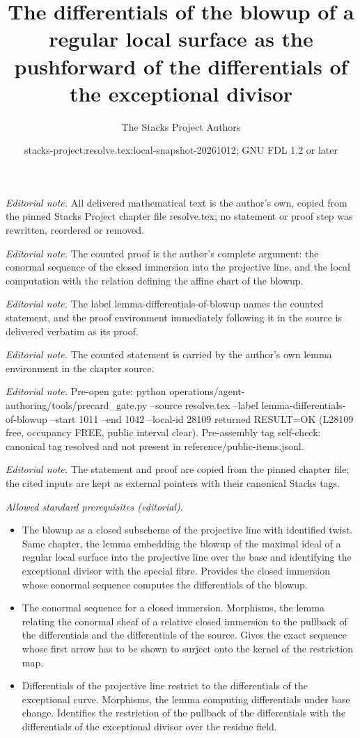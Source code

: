 \documentclass[10pt,a4paper]{amsart}
\title{The differentials of the blowup of a regular local surface as the pushforward of the differentials of the exceptional divisor}
\author{The Stacks Project Authors}
\date{stacks-project:resolve.tex:local-snapshot-20261012; GNU FDL 1.2 or later}
\theoremstyle{plain}
\theoremstyle{definition}
\theoremstyle{remark}
\numberwithin{equation}{subsection}
\begin{document}
\maketitle
\noindent\textit{Editorial note.} All delivered mathematical text is the author's own, copied from the pinned Stacks Project chapter file resolve.tex; no statement or proof step was rewritten, reordered or removed.\par\medskip
\noindent\textit{Editorial note.} The counted proof is the author's complete argument: the conormal sequence of the closed immersion into the projective line, and the local computation with the relation defining the affine chart of the blowup.\par\medskip
\noindent\textit{Editorial note.} The label lemma-differentials-of-blowup names the counted statement, and the proof environment immediately following it in the source is delivered verbatim as its proof.\par\medskip
\noindent\textit{Editorial note.} The counted statement is carried by the author's own lemma environment in the chapter source.\par\medskip
\noindent\textit{Editorial note.} Pre-open gate: python operations/agent-authoring/tools/precard\_gate.py --source resolve.tex --label lemma-differentials-of-blowup --start 1011 --end 1042 --local-id 28109 returned RESULT=OK (L28109 free, occupancy FREE, public interval clear). Pre-assembly tag self-check: canonical tag resolved and not present in reference/public-items.jsonl.\par\medskip
\noindent\textit{Editorial note.} The statement and proof are copied from the pinned chapter file; the cited inputs are kept as external pointers with their canonical Stacks tags.\par\medskip
\noindent\textit{Allowed standard prerequisites (editorial).}\begin{itemize}
\item The blowup as a closed subscheme of the projective line with identified twist. Same chapter, the lemma embedding the blowup of the maximal ideal of a regular local surface into the projective line over the base and identifying the exceptional divisor with the special fibre. Provides the closed immersion whose conormal sequence computes the differentials of the blowup.
\item The conormal sequence for a closed immersion. Morphisms, the lemma relating the conormal sheaf of a relative closed immersion to the pullback of the differentials and the differentials of the source. Gives the exact sequence whose first arrow has to be shown to surject onto the kernel of the restriction map.
\item Differentials of the projective line restrict to the differentials of the exceptional curve. Morphisms, the lemma computing differentials under base change. Identifies the restriction of the pullback of the differentials with the differentials of the exceptional divisor over the residue field.
\end{itemize}\medskip
\end{document}
